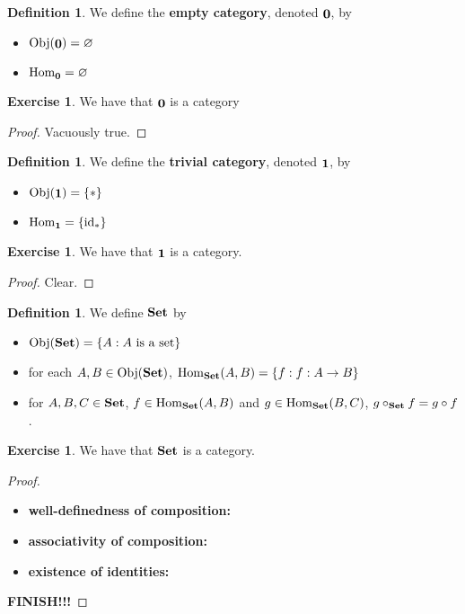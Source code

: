 \documentclass[12pt]{amsart}
\theoremstyle{definition}
\newtheorem{defn}[definition]{Definition}
\newtheorem{ex}[definition]{Exercise}
\newcommand{\tbf}[1]{\textbf{#1}}
\DeclareMathOperator{\id}{id}
\DeclareMathOperator{\Obj}{Obj}
\DeclareMathOperator{\Hom}{Hom}
\DeclareMathOperator*{\Set}{\text{\tbf{Set}}}
\DeclareMathOperator*{\0}{\mbf{0}}
\DeclareMathOperator*{\1}{\mbf{1}}
\newcommand{\lex}[1]{\label{ex:#1}}
\newcommand{\ld}[1]{\label{defn:#1}}
\begin{document}
	\begin{defn} \ld{12001.1}
		We define the \textbf{empty category}, denoted $\0$, by 
		\begin{itemize}
			\item $\Obj(\0) = \varnothing$
			\item $\Hom_{\0} = \varnothing$
		\end{itemize}
	\end{defn}

	\begin{ex} \lex{12001.2}
		We have that $\0$ is a category
	\end{ex}
	
	\begin{proof}
		Vacuously true.
	\end{proof}

	\begin{defn} \ld{12001.}
		We define the \textbf{trivial category}, denoted $\1$, by 
		\begin{itemize}
			\item $\Obj(\1) = \{*\}$
			\item $\Hom_{\1} = \{\id_*\}$
		\end{itemize}
	\end{defn}

	\begin{ex} \lex{12001.}
		We have that $\1$ is a category.
	\end{ex}

	\begin{proof}
		Clear.
	\end{proof}
	
	\begin{defn} \ld{12001.}
		We define $\Set$ by  
		\begin{itemize}
			\item $\Obj(\Set) = \{A: A \text{ is a set}\}$ 
			\item for each $A,B \in \Obj(\Set)$, $\Hom_{\Set}(A,B) = \{f: f:A \rightarrow B\}$
			\item for $A, B, C \in \Set$, $f \in \Hom_{\Set}(A, B)$ and $g \in \Hom_{\Set}(B, C)$, $g \circ_{\Set} f = g \circ f$. 
		\end{itemize}
	\end{defn}

	\begin{ex} \lex{12001.}
		We have that $\Set$ is a category.
	\end{ex}

	\begin{proof}\
		\begin{itemize}
			\item \tbf{well-definedness of composition:}
			\item \tbf{associativity of composition:} 
			\item \tbf{existence of identities:} 
		\end{itemize}
		\tbf{FINISH!!!}
	\end{proof}
	
\end{document}
